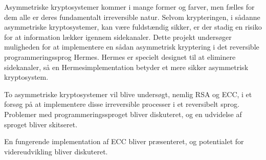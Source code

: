 \documentclass[a4paper,11pt,oneside]{memoir}
\begin{document}
\begin{resume}

Asymmetriske kryptosystemer kommer i mange former og farver, men fælles for dem alle er deres fundamentalt irreversible natur. Selvom krypteringen, i sådanne asymmetriske kryptosystemer, kan være fuldstændig sikker, er der stadig en risiko for at information lækker igennem sidekanaler. Dette projekt undersøger muligheden for at implementere en sådan asymmetrisk kryptering i det reversible programmeringssprog Hermes. Hermes er specielt designet til at eliminere sidekanaler, så en Hermesimplementation betyder et mere sikker asymmetrisk kryptosystem.

To asymmetriske kryptosystemer vil blive undersøgt, nemlig RSA og ECC, i et forsøg på at implementere disse irreversible processer i et reversibelt sprog. Problemer med programmeringssproget bliver diskuteret, og en udvidelse af sproget bliver skitseret.

En fungerende implementation af ECC bliver præsenteret, og potentialet for videreudvikling bliver diskuteret.

\end{resume}

\cleardoublepage
{}
\tableofcontents*

\cleardoublepage
{}
\setcounter{page}{1}












\end{document}
